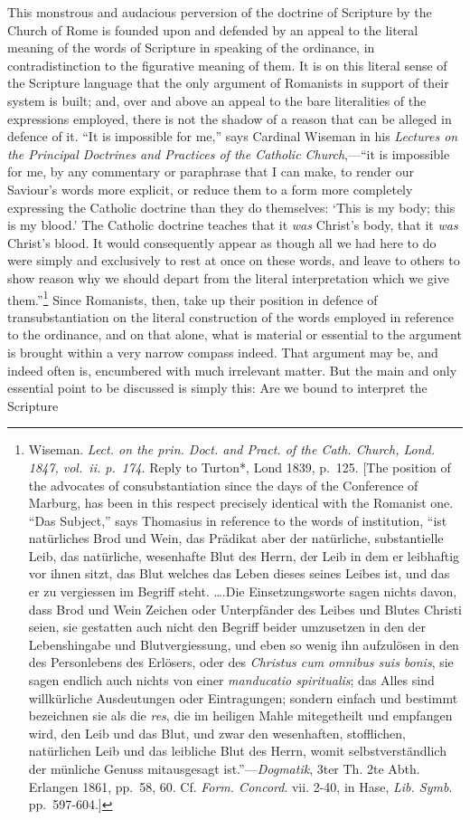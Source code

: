 \documentclass[english,]{book}
\begin{document}
This monstrous and audacious perversion of the doctrine of Scripture by the Church of Rome is founded upon and defended by an appeal to the literal meaning of the words of Scripture in speaking of the ordinance, in contradistinction to the figurative meaning of them. It is on this literal sense of the Scripture language that the only argument of Romanists in support of their system is built; and, over and above an appeal to the bare literalities of the expressions employed, there is not the shadow of a reason that can be alleged in defence of it. ``It is impossible for me,'' says Cardinal Wiseman in his \emph{Lectures on the Principal Doctrines and Practices of the Catholic Church},---``it is impossible for me, by any commentary or paraphrase that I can make, to render our Saviour's words more explicit, or reduce them to a form more completely expressing the Catholic doctrine than they do themselves: `This is my body; this is my blood.' The Catholic doctrine teaches that it \emph{was} Christ's body, that it \emph{was} Christ's blood. It would consequently appear as though all we had here to do were simply and exclusively to rest at once on these words, and leave to others to show reason why we should depart from the literal interpretation which we give them.''\footnote{Wiseman. \emph{Lect. on the prin. Doct. and Pract. of the Cath. Church, Lond. 1847, vol.~ii. p.~174. }Reply to Turton*, Lond 1839, p.~125. {[}The position of the advocates of consubstantiation since the days of the Conference of Marburg, has been in this respect precisely identical with the Romanist one. ``Das Subject,'' says Thomasius in reference to the words of institution, ``ist natürliches Brod und Wein, das Prädikat aber der natürliche, substantielle Leib, das natürliche, wesenhafte Blut des Herrn, der Leib in dem er leibhaftig vor ihnen sitzt, das Blut welches das Leben dieses seines Leibes ist, und das er zu vergiessen im Begriff steht. \ldots{}.Die Einsetzungsworte sagen nichts davon, dass Brod und Wein Zeichen oder Unterpfänder des Leibes und Blutes Christi seien, sie gestatten auch nicht den Begriff beider umzusetzen in den der Lebenshingabe und Blutvergiessung, und eben so wenig ihn aufzulösen in den des Personlebens des Erlösers, oder des \emph{Christus cum omnibus suis bonis}, sie sagen endlich auch nichts von einer \emph{manducatio spiritualis}; das Alles sind willkürliche Ausdeutungen oder Eintragungen; sondern einfach und bestimmt bezeichnen sie als die \emph{res}, die im heiligen Mahle mitegetheilt und empfangen wird, den Leib und das Blut, und zwar den wesenhaften, stofflichen, natürlichen Leib und das leibliche Blut des Herrn, womit selbstverständlich der münliche Genuss mitausgesagt ist.''---\emph{Dogmatik}, 3ter Th. 2te Abth. Erlangen 1861, pp.~58, 60. Cf. \emph{Form. Concord}. vii. 2-40, in Hase, \emph{Lib. Symb}. pp.~597-604.{]}} Since Romanists, then, take up their position in defence of transubstantiation on the literal construction of the words employed in reference to the ordinance, and on that alone, what is material or essential to the argument is brought within a very narrow compass indeed. That argument may be, and indeed often is, encumbered with much irrelevant matter. But the main and only essential point to be discussed is simply this: Are we bound to interpret the Scripture 
\end{document}
